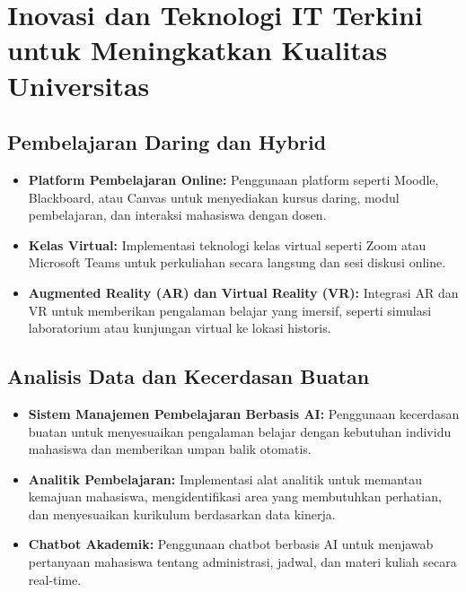 \section{Inovasi dan Teknologi IT Terkini untuk Meningkatkan Kualitas Universitas}

\subsection{Pembelajaran Daring dan Hybrid}
\begin{itemize}
	\item \textbf{Platform Pembelajaran Online:} Penggunaan platform seperti Moodle, Blackboard, atau Canvas untuk menyediakan kursus daring, modul pembelajaran, dan interaksi mahasiswa dengan dosen.
	\item \textbf{Kelas Virtual:} Implementasi teknologi kelas virtual seperti Zoom atau Microsoft Teams untuk perkuliahan secara langsung dan sesi diskusi online.
	\item \textbf{Augmented Reality (AR) dan Virtual Reality (VR):} Integrasi AR dan VR untuk memberikan pengalaman belajar yang imersif, seperti simulasi laboratorium atau kunjungan virtual ke lokasi historis.
\end{itemize}

\subsection{Analisis Data dan Kecerdasan Buatan}
\begin{itemize}
	\item \textbf{Sistem Manajemen Pembelajaran Berbasis AI:} Penggunaan kecerdasan buatan untuk menyesuaikan pengalaman belajar dengan kebutuhan individu mahasiswa dan memberikan umpan balik otomatis.
	\item \textbf{Analitik Pembelajaran:} Implementasi alat analitik untuk memantau kemajuan mahasiswa, mengidentifikasi area yang membutuhkan perhatian, dan menyesuaikan kurikulum berdasarkan data kinerja.
	\item \textbf{Chatbot Akademik:} Penggunaan chatbot berbasis AI untuk menjawab pertanyaan mahasiswa tentang administrasi, jadwal, dan materi kuliah secara real-time.
\end{itemize}


